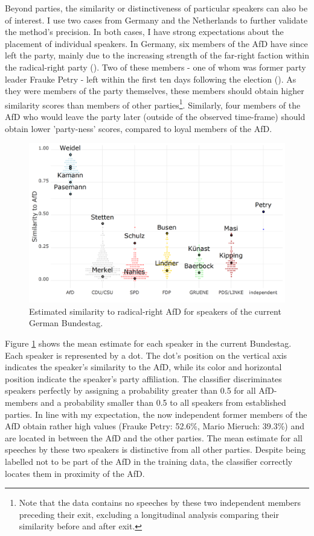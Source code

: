 \documentclass{article}
\begin{document}
Beyond parties, the similarity or distinctiveness of particular speakers can also be of interest. I use two cases from Germany and the Netherlands to further validate the method's precision. In both cases, I have strong expectations about the placement of individual speakers. In Germany, six members of the AfD have since left the party, mainly due to the increasing strength of the far-right faction within the radical-right party (\cite{Steffen2020AfD}). Two of these members - one of whom was former party leader Frauke Petry - left within the first ten days following the election (\cite{LSE2018AfD}). As they were members of the party themselves, these members should obtain higher similarity scores than members of other parties\footnote{Note that the data contains no speeches by these two independent members preceding their exit, excluding a longitudinal analysis comparing their similarity before and after exit.}. Similarly, four members of the AfD who would leave the party later (outside of the observed time-frame) should obtain lower 'party-ness' scores, compared to loyal members of the AfD. \par

\begin{figure}
    \centering
    \includegraphics[width=\textwidth]{DE/vis/DE_speakers_PA.png}
    \caption{Estimated similarity to radical-right AfD for speakers of the current German Bundestag.}
    \label{fig:speakers}
\end{figure}

Figure \ref{fig:speakers} shows the mean estimate for each speaker in the current Bundestag. Each speaker is represented by a dot. The dot's position on the vertical axis indicates the speaker's similarity to the AfD, while its color and horizontal position indicate the speaker's party affiliation. The classifier discriminates speakers perfectly by assigning a probability greater than 0.5 for all AfD-members and a probability smaller than 0.5 to all speakers from established parties. In line with my expectation, the now independent former members of the AfD obtain rather high values (Frauke Petry: 52.6\%, Mario Mieruch: 39.3\%) and are located in between the AfD and the other parties. The mean estimate for all speeches by these two speakers is distinctive from all other parties. Despite being labelled not to be part of the AfD in the training data, the classifier correctly locates them in proximity of the AfD. \par
\end{document}
